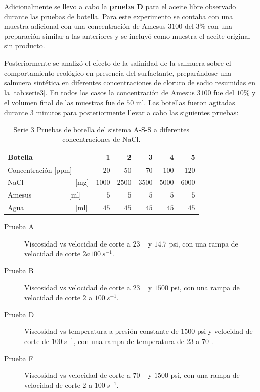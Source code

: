 Adicionalmente se llevo a cabo la \textbf{prueba D} para el aceite libre observado durante las pruebas de botella. Para este experimento se contaba con una muestra adicional con una concentración de Amesus $3100$ del $3$\% con una preparación similar a las anteriores y se incluyó como muestra el aceite original sin producto.

Posteriormente se analizó el efecto de la salinidad de la salmuera sobre el comportamiento reológico en presencia del surfactante, preparándose una salmuera sintética en diferentes concentraciones de cloruro de sodio resumidas en la \autoref{tab:serie3}. En todos los casos la concentración de Amesus $3100$ fue del $10\%$ y el volumen final de las muestras fue de $50$ ml. Las botellas fueron agitadas durante $3$ minutos para posteriormente llevar a cabo las siguientes pruebas:

 \begin{table} 
    \caption[Efecto de la salinidad]{Serie $3$ Pruebas de botella del sistema A-S-S a diferentes concentraciones de NaCl.}
    \centering
    \begin{tabulary}{1.1\textwidth}{L |R|R|R|R|R|}
        \toprule
        Botella & \textbf{1} & \textbf{2} & \textbf{3} & \textbf{4} & \textbf{5}  \\
        \midrule
        Concentración [ppm] & $20$  & $50$ & $70$  & $100$ & $120$ \\
        NaCl ~~~~~~~~~~~~~~[mg] & $1000$  & $2500$ & $3500$ & $5000$ & $6000$ \\
        Amesus ~~~~~~~~~~[ml] & $5$ & $5$ & $5$ & $5$ & $5$ \\
        Agua ~~~~~~~~~~~~~~[ml] & $45$ & $45$ & $45$ & $45$ & $45$ \\
        
        \midrule
        \bottomrule
    \end{tabulary}
    \label{tab:serie3}
\end{table}


\begin{description}
    \item [Prueba A] Viscosidad vs velocidad de corte a $23$ \celsius~ y $14.7$ psi, con una rampa de velocidad de corte $2 a 100~ s^{-1}$.
    \item [Prueba B] Viscosidad vs velocidad de corte a $23$ \celsius~ y $1500$ psi, con una rampa de velocidad de corte $2$ a $100~ s^{-1}$.
    \item [Prueba D] Viscosidad vs temperatura a presión constante de $1500$ psi y velocidad de corte de $100~s^{-1}$, con una rampa de temperatura de $23$ a $70$ \celsius.
    \item [Prueba F] Viscosidad vs velocidad de corte a $70$ \celsius~ y $1500$ psi, con una rampa de velocidad de corte $2$ a $100~ s^{-1}$.
\end{description}


